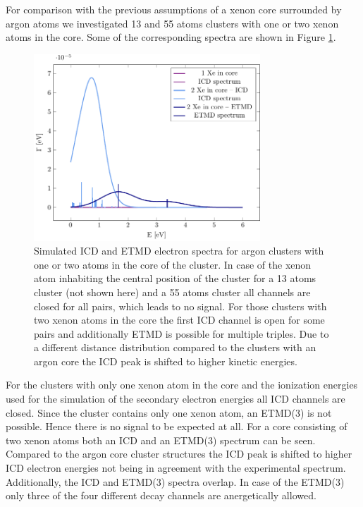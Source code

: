 For comparison with the previous assumptions of a xenon core surrounded
by argon atoms we investigated 13 and 55 atoms clusters with one or two
xenon atoms in the core. Some of the corresponding
spectra are shown in Figure \ref{figure:xe_3_in}.

\begin{figure}[h]
 \centering
 \includegraphics[width=8.5cm]{pics/xe_3_in.pdf}
 \caption{Simulated ICD and ETMD electron spectra for argon clusters with
          one or two atoms in the core of the cluster. In case of the xenon
          atom inhabiting the central position of the cluster for a 13 atoms
          cluster (not shown here) and a 55 atoms cluster all channels are closed
          for all pairs, which leads to no signal. For those clusters with two
          xenon atoms in the core the first ICD channel is open for some pairs
          and additionally ETMD is possible for multiple triples. Due to a
          different distance distribution compared to the clusters with an argon
          core the ICD peak is shifted to higher kinetic energies.}
 \label{figure:xe_3_in}
\end{figure}

For the clusters with only one xenon atom in the core and the ionization
energies used for the simulation of the secondary electron energies
all ICD channels are closed. Since the cluster contains only one xenon atom,
an ETMD(3) is not possible. Hence there is no signal to be expected at all.
For a core consisting of two xenon atoms both an ICD and an ETMD(3) spectrum
can be seen. Compared to the argon core cluster structures the ICD peak is
shifted to higher ICD electron energies not being in agreement with
the experimental spectrum. Additionally, the ICD and ETMD(3) spectra overlap.
In case of the ETMD(3) only three of the four different decay channels are
anergetically allowed.


